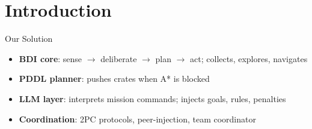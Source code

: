 \section{Introduction}
\label{sec:introduction}
\begin{frame}{Our Solution}
  \begin{itemize}
    \item \textbf{BDI core}: sense $\to$ deliberate $\to$ plan $\to$ act; collects, explores, navigates
    \item \textbf{PDDL planner}: pushes crates when A* is blocked
    \item \textbf{LLM layer}: interprets mission commands; injects goals, rules, penalties
    \item \textbf{Coordination}: 2PC protocols, peer-injection, team coordinator
  \end{itemize}
\end{frame}
